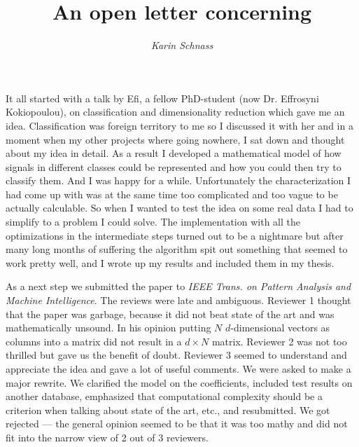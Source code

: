 \documentclass[11pt]{article}
\begin{document}
\title{\bf An open letter concerning \\
\vspace{5mm}{\em   Classification via incoherent subspaces  }}
\author{\large\em Karin Schnass}

\date{} %

\maketitle
\thispagestyle{empty}

It all started with a talk by Efi, a fellow PhD-student (now Dr. Effrosyni Kokiopoulou), on classification and  dimensionality reduction which gave me an idea. Classification was foreign territory to me so I discussed it with her and in a moment when my other projects where going nowhere, I sat down and thought about my idea in detail. As a result I developed a mathematical model of how signals in different classes could be represented and how you could then try to classify them. And I was happy for a while. Unfortunately the characterization I had come up with was at the same time too complicated and too vague to be actually calculable. So when I wanted to test the idea on some real data I had to simplify to a problem I could solve. The implementation with all the optimizations in the intermediate steps turned out to be a nightmare but after many long months of suffering the algorithm spit out something that seemed to work pretty well, and I wrote up my results and included them in my thesis.

As a next step we submitted the paper to {\em IEEE Trans. on Pattern Analysis and Machine Intelligence}. The reviews were late and ambiguous. Reviewer 1 thought that the paper was garbage, because it did not beat state of the art and was mathematically unsound. In his opinion putting $N$ $d$-dimensional vectors as columns into a matrix did not result in a $d\times N$ matrix. Reviewer 2 was not too thrilled but gave us the benefit of doubt. Reviewer 3 seemed to understand and appreciate the idea and gave a lot of useful comments. We were asked to make a major rewrite. We clarified the model on the coefficients, included test results on another database, emphasized that computational complexity should be a criterion when talking about state of the art, etc., and resubmitted. We got rejected --- the general opinion seemed to be that it was too mathy and did not fit into the narrow view of 2 out of 3 reviewers.
\end{document}
